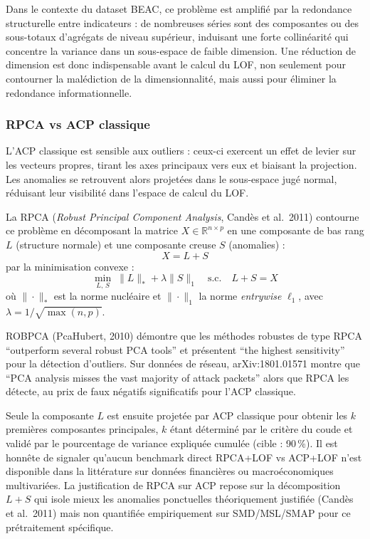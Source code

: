 \documentclass[12pt,a4paper]{article}
\begin{document}
Dans le contexte du dataset BEAC, ce problème est amplifié par la redondance
structurelle entre indicateurs : de nombreuses séries sont des composantes ou
des sous-totaux d'agrégats de niveau supérieur, induisant une forte
collinéarité qui concentre la variance dans un sous-espace de faible dimension.
Une réduction de dimension est donc indispensable avant le calcul du LOF, non
seulement pour contourner la malédiction de la dimensionnalité, mais aussi
pour éliminer la redondance informationnelle.

\subsubsection{RPCA vs ACP classique}

L'ACP classique est sensible aux outliers : ceux-ci exercent un effet de
levier sur les vecteurs propres, tirant les axes principaux vers eux et
biaisant la projection. Les anomalies se retrouvent alors projetées dans le
sous-espace jugé normal, réduisant leur visibilité dans l'espace de calcul
du LOF.

La RPCA (\textit{Robust Principal Component Analysis}, Candès et al.\ 2011)
contourne ce problème en décomposant la matrice $X \in \mathbb{R}^{n \times p}$
en une composante de bas rang $L$ (structure normale) et une composante creuse
$S$ (anomalies) :
$$X = L + S$$
par la minimisation convexe :
$$\min_{L,\,S} \; \|L\|_* + \lambda\|S\|_1
\quad \text{s.c.} \quad L + S = X$$
où $\|\cdot\|_*$ est la norme nucléaire et $\|\cdot\|_1$ la norme
\textit{entrywise} $\ell_1$, avec $\lambda = 1/\sqrt{\max(n,p)}$.

ROBPCA (PcaHubert, 2010) démontre que les méthodes robustes de type RPCA
``outperform several robust PCA tools'' et présentent ``the highest sensitivity''
pour la détection d'outliers. Sur données de réseau, arXiv:1801.01571 montre
que ``PCA analysis misses the vast majority of attack packets'' alors que RPCA
les détecte, au prix de faux négatifs significatifs pour l'ACP classique.

Seule la composante $L$ est ensuite projetée par ACP classique pour obtenir
les $k$ premières composantes principales, $k$ étant déterminé par le critère
du coude et validé par le pourcentage de variance expliquée cumulée (cible :
90\,\%). Il est honnête de signaler qu'aucun benchmark direct RPCA+LOF vs
ACP+LOF n'est disponible dans la littérature sur données financières ou
macroéconomiques multivariées. La justification de RPCA sur ACP repose sur
la décomposition $L + S$ qui isole mieux les anomalies ponctuelles 
théoriquement justifiée (Candès et al.\ 2011) mais non quantifiée
empiriquement sur SMD/MSL/SMAP pour ce prétraitement spécifique.
\end{document}
